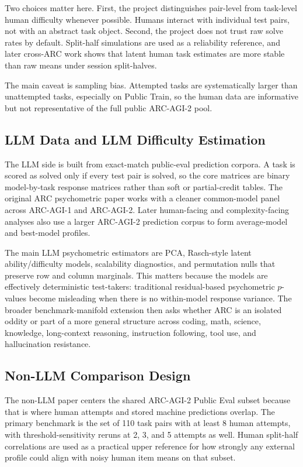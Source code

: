 \documentclass[11pt,letterpaper]{article}
\begin{document}
Two choices matter here. First, the project distinguishes pair-level from task-level human difficulty whenever possible. Humans interact with individual test pairs, not with an abstract task object. Second, the project does not trust raw solve rates by default. Split-half simulations are used as a reliability reference, and later cross-ARC work shows that latent human task estimates are more stable than raw means under session split-halves.

The main caveat is sampling bias. Attempted tasks are systematically larger than unattempted tasks, especially on Public Train, so the human data are informative but not representative of the full public ARC-AGI-2 pool.

\subsection{LLM Data and LLM Difficulty Estimation}

The LLM side is built from exact-match public-eval prediction corpora. A task is scored as solved only if every test pair is solved, so the core matrices are binary model-by-task response matrices rather than soft or partial-credit tables. The original ARC psychometric paper works with a cleaner common-model panel across ARC-AGI-1 and ARC-AGI-2. Later human-facing and complexity-facing analyses also use a larger ARC-AGI-2 prediction corpus to form average-model and best-model profiles.

The main LLM psychometric estimators are PCA, Rasch-style latent ability/difficulty models, scalability diagnostics, and permutation nulls that preserve row and column marginals. This matters because the models are effectively deterministic test-takers: traditional residual-based psychometric $p$-values become misleading when there is no within-model response variance. The broader benchmark-manifold extension then asks whether ARC is an isolated oddity or part of a more general structure across coding, math, science, knowledge, long-context reasoning, instruction following, tool use, and hallucination resistance.

\subsection{Non-LLM Comparison Design}

The non-LLM paper centers the shared ARC-AGI-2 Public Eval subset because that is where human attempts and stored machine predictions overlap. The primary benchmark is the set of 110 task pairs with at least 8 human attempts, with threshold-sensitivity reruns at 2, 3, and 5 attempts as well. Human split-half correlations are used as a practical upper reference for how strongly any external profile could align with noisy human item means on that subset.
\end{document}
